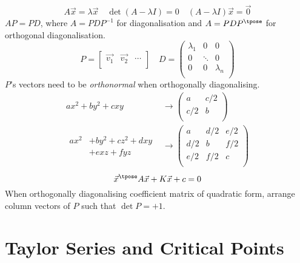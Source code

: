 \documentclass[10pt, a4paper]{article}
\begin{document}
\begin{landscape}
\begin{multicols}{3}
    \[
        A\vec{x} = \lambda \vec{x} \quad \det (A - \lambda I) = 0 \quad (A - \lambda I) \vec{x} = \vec{0}
    \]
    \(AP = PD\), where \(A = PDP^{-1}\) for diagonalisation and \(A = PDP^{\tpose}\) for orthogonal diagonalisation.
    \[
        P = \begin{bmatrix}
            \vec{v_1} & \vec{v_2} & \cdots \\ 
        \end{bmatrix}
        \quad
        D = \begin{pmatrix}
            \lambda_1 & 0 & 0 \\ 
            0 & \ddots & 0 \\ 
            0 & 0 & \lambda_{n} \\ 
        \end{pmatrix}
    \]
    \(P\)'s vectors need to be \emph{orthonormal} when orthogonally diagonalising.
    \begin{align*}
        ax^{2} + by^{2} + cxy &\longrightarrow \begin{pmatrix}
            a & c/2 \\ 
            c/2 & b \\ 
        \end{pmatrix} \\
        \begin{aligned}
            ax^{2} &+ by^{2} + cz^{2} + dxy\\
            &+ exz + fyz
        \end{aligned}
         &\longrightarrow \begin{pmatrix}
            a & d/2 & e/2 \\ 
            d/2 & b & f/2 \\ 
            e/2 & f/2 & c \\ 
        \end{pmatrix}
    \end{align*}
    \[\vec{x}^{\tpose} A \vec{x} + K \vec{x} + c = 0\]
    When orthogonally diagonalising coefficient matrix of quadratic form, arrange column vectors of
    \(P\) such that \(\det P = +1\).

    \section{Taylor Series and Critical Points}


\end{multicols}
\end{landscape}
\end{document}
